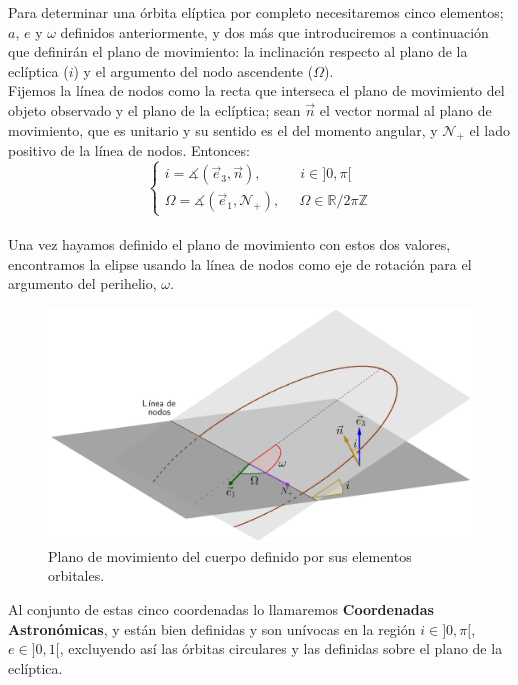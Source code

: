 \documentclass[11pt]{book}
\begin{document}
Para determinar una órbita elíptica por completo necesitaremos cinco elementos; $a$, $e$ y $\omega$ definidos anteriormente, y dos más que introduciremos a continuación que definirán el plano de movimiento: la inclinación respecto al plano de la eclíptica ($i$) y el argumento del nodo ascendente ($\Omega$).\\

Fijemos la línea de nodos como la recta que interseca el plano de movimiento del objeto observado y el plano de la eclíptica; sean $\vec{n}$ el vector normal al plano de movimiento, que es unitario y su sentido es el del momento angular, y $\mathcal{N}_+$ el lado positivo de la línea de nodos. Entonces:
\[
\left\{
\begin{array}{l}
	i=\measuredangle(\vec{e}_3,\vec{n}), \; \; \; \; \; \; \; \; \; \; i\in]0,\pi[\\
	\Omega=\measuredangle(\vec{e}_1, \mathcal{N}_+), \; \; \; \; \; \Omega\in\mathbb{R}/2\pi\mathbb{Z}
\end{array}
\right.
\]\\

Una vez hayamos definido el plano de movimiento con estos dos valores, encontramos la elipse usando la línea de nodos como eje de rotación para el argumento del perihelio, $\omega$.

\begin{figure}[H]
\centering
\includegraphics[scale=0.34]{images/omega_i.png}
\caption{Plano de movimiento del cuerpo definido por sus elementos orbitales.}
\label{fig:omega_i}
\end{figure}

Al conjunto de estas cinco coordenadas lo llamaremos \textbf{Coordenadas Astronómicas}, y están bien definidas y son unívocas en la región $i\in]0,\pi[$, $e\in]0,1[$, excluyendo así las órbitas circulares y las definidas sobre el plano de la eclíptica.\\
\end{document}
